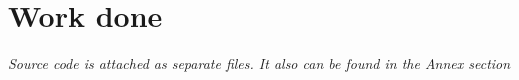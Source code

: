 \section{Work done}

\textit{Source code is attached as separate files. It also can be found in the Annex section}
